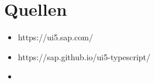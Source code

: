 \chapter[Quellen]{Quellen} 
\begin{itemize}
    \item https://ui5.sap.com/
    \item https://sap.github.io/ui5-typescript/
    \item 
\end{itemize}